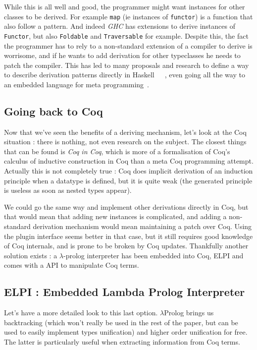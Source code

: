 \documentclass{article}
\begin{document}
While this is all well and good, the programmer might want instances for other
classes to be derived. For example \texttt{map} (ie instances of \texttt{functor})
is a function that also follow a pattern. And indeed \emph{GHC} has extensions
to derive instances of \texttt{Functor}, but also \texttt{Foldable} and
\texttt{Traversable} for example. Despite this, the fact the programmer has to
rely to a non-standard extension of a compiler to derive is worrisome, and if he
wants to add derivation for other typeclasses he needs to patch the compiler.
This has led to many proposals and research to define a way to describe derivation
patterns directly in Haskell~\cite{genDerHaskell10}~\cite{reflDer97}~\cite{genDep},
even going all the way to an embedded language for meta programming~\cite{templateHaskell}.

\subsection{Going back to Coq}

Now that we've seen the benefits of a deriving mechanism, let's look at the Coq
situation : there is nothing, not even research on the subject. The closest
things that can be found is \emph{Coq in Coq}\cite{coqincoq}, which is more of
a formalisation of Coq's calculus of inductive construction in Coq than a
meta Coq programming attempt. Actually this is not completely true : Coq does
implicit derivation of an induction principle when a datatype is defined, but
it is quite weak (the generated principle is useless as soon as nested types
appear).

We could go the same way and implement other derivations directly in Coq, but
that would mean that adding new instances is complicated, and adding a
non-standard derivation mechanism would mean maintaining a patch over Coq. Using
the plugin interface seems better in that case, but it still requires good
knowledge of Coq internals, and is prone to be broken by Coq updates. Thankfully
another solution exists : a $\lambda$-prolog\cite{HiOrProg} interpreter has
been embedded into Coq, ELPI\cite{ELPI} and comes with a API to manipulate
Coq terms.

\subsection{ELPI : Embedded Lambda Prolog Interpreter}

Let's have a more detailed look to this last option. $\lambda$Prolog brings us
backtracking (which won't really be used in the rest of the paper, but can be
used to easily implement types unification\cite{ELPItype}) and higher order unification
for free. The latter is particularly useful when extracting information from
Coq terms.
\end{document}
